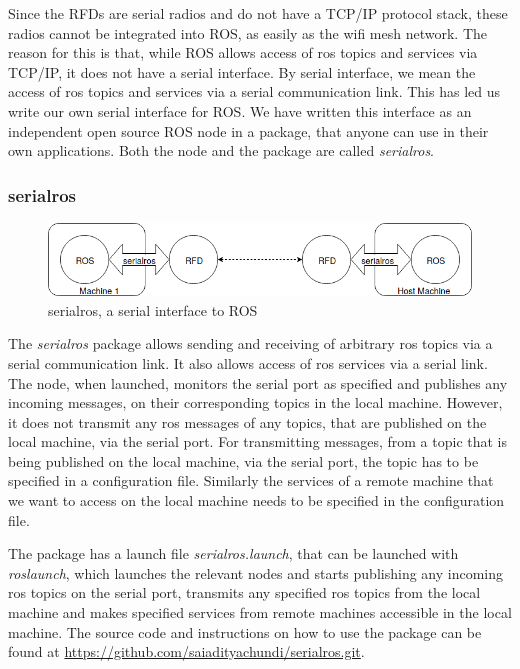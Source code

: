 Since the RFDs are serial radios and do not have a TCP/IP protocol stack, these radios cannot be integrated into ROS, as easily as the wifi mesh network. The reason for this is that, while ROS allows access of ros topics and services via TCP/IP, it does not have a serial interface. By serial interface, we mean the access of ros topics and services via a serial communication link. This has led us write our own serial interface for ROS. We have written this interface as an independent open source ROS node in a package, that anyone can use in their own applications. Both the node and the package are called \textit{serialros}.

\subsubsection{serialros}

\begin{figure}[h]
	\centering
	\includegraphics[scale=0.5]{Pictures/serialros.png}
	\caption{serialros, a serial interface to ROS}
	\label{fig: serialros}
\end{figure}

The \textit{serialros} package allows sending and receiving of arbitrary ros topics via a serial communication link. It also allows access of ros services via a serial link. The node, when launched, monitors the serial port as specified and publishes any incoming messages, on their corresponding topics in the local machine. However, it does not transmit any ros messages of any topics, that are published on the local machine, via the serial port. For transmitting messages, from a topic that is being published on the local machine, via the serial port, the topic has to be specified in a configuration file. Similarly the services of a remote machine that we want to access on the local machine needs to be specified in the configuration file.

The package has a launch file \textit{serialros.launch}, that can be launched with \textit{roslaunch}, which launches the relevant nodes and starts publishing any incoming ros topics on the serial port, transmits any specified ros topics from the local machine and makes specified services from remote machines accessible in the local machine. The source code and instructions on how to use the package can be found at \url{https://github.com/saiadityachundi/serialros.git}.

